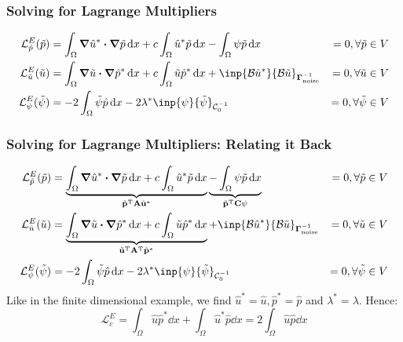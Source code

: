 \documentclass[
  pdf,
  10pt,
  xcolor={svgnames},
]{beamer}
\newcommand{\mbf}[1]{\mathbf{#1}}
\newcommand{\mc}[1]{\mathcal{#1}}
\newcommand{\T}{\mathrm{T}}
\newcommand{\mat}[1]{\mathbf{{#1}}}
\newcommand{\Gnoise}{\mat{\Gamma}_{\rm noise}}
\begin{document}
\begin{frame}
  \frametitle{Solving for Lagrange Multipliers}
  \begin{align*}
    \mc{L}^E_{\hat{p}}(\tilde{p})
     & =
    \int_\Omega \grad \hat{u}^* \vdot \grad \tilde{p} \dd{x}
    + c \int_\Omega \hat{u}^* \tilde{p} \dd{x}
    -\int_\Omega \psi \tilde{p} \dd{x}
     & = 0, \forall \tilde{p} \in V    \\
    \mc{L}^E_{\hat{u}}(\tilde{u})
     & =
    \int_\Omega \grad \tilde{u} \vdot \grad \hat{p}^* \dd{x}
    + c\int_\Omega \tilde{u} \hat{p}^* \dd{x}
    + \inp{\mc{B} \hat{u}^*}{\mc{B}\tilde{u}}_{\Gnoise^{-1}}
     & = 0, \forall \tilde{u} \in V    \\
    \mc{L}^E_{\psi}(\tilde{\psi})
     & =
    -2 \int_\Omega \tilde{\psi} \hat{p} \dd{x}
    -2 \lambda^* \inp{\psi}{\tilde{\psi}}_{\mc{C}_0^{-1}}
     & = 0, \forall \tilde{\psi} \in V
  \end{align*}
\end{frame}
\begin{frame}
  \frametitle{Solving for Lagrange Multipliers: Relating it Back}
  \begin{align*}
    \mc{L}^E_{\hat{p}}(\tilde{p})
     & =
    \underbrace{
      \int_\Omega \grad \hat{u}^* \vdot \grad \tilde{p} \dd{x}
      + c \int_\Omega \hat{u}^* \tilde{p} \dd{x}
    }_{\tilde{\mbf{p}}^\T \mat{A} \hat{\mbf{u}}^*}
    \underbrace{
      -\int_\Omega \psi \tilde{p} \dd{x}
    }_{\tilde{\mbf{p}}^\T \mat{C} \mbf{\psi}}
     & = 0, \forall \tilde{p} \in V    \\
    \mc{L}^E_{\hat{u}}(\tilde{u})
     & =
    \underbrace{
      \int_\Omega \grad \tilde{u} \vdot \grad \hat{p}^* \dd{x}
      + c\int_\Omega \tilde{u} \hat{p}^* \dd{x}
    }_{\tilde{\mbf{u}}^\T \mat{A}^\T \hat{\mbf{p}}^*}
    + \inp{\mc{B} \hat{u}^*}{\mc{B}\tilde{u}}_{\Gnoise^{-1}}
     & = 0, \forall \tilde{u} \in V    \\
    \mc{L}^E_{\psi}(\tilde{\psi})
     & =
    -2 \int_\Omega \tilde{\psi} \hat{p} \dd{x}
    -2 \lambda^* \inp{\psi}{\tilde{\psi}}_{\mc{C}_0^{-1}}
     & = 0, \forall \tilde{\psi} \in V
  \end{align*}
  Like in the finite dimensional example, we find $\hat{u}^* = \hat{u},
    \hat{p}^* = \hat{p}$ and $\lambda^* = \lambda$. Hence:
  \[
    \mc{L}^E_c
    =
    \int_\Omega \hat{u} \hat{p}^* \dd{x}
    + \int_\Omega \hat{u}^* \hat{p} \dd{x}
    =
    2\int_\Omega \hat{u} \hat{p} \dd{x}
  \]
\end{frame}
\end{document}
